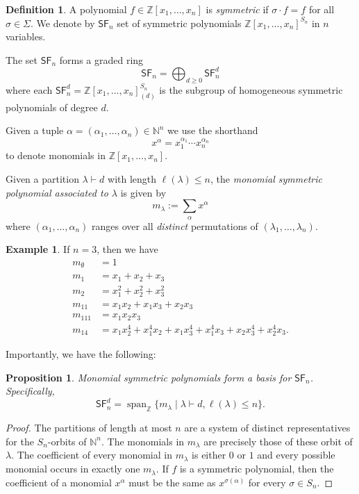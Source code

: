 \documentclass[12pt]{article}
\theoremstyle{plain}
\newtheorem{proposition}[theorem]{Proposition}
\theoremstyle{definition}
\newtheorem{definition}[theorem]{Definition}
\newtheorem{example}[theorem]{Example}
\theoremstyle{remark}
\numberwithin{equation}{section}
\begin{document}
\begin{definition}
A polynomial $f \in \mathbb{Z}[x_1,\ldots, x_n]$ is \emph{symmetric}
if $\sigma \cdot f = f$ for all $\sigma \in \Sigma$.
We denote by $\mathsf{SF}_n$ set of symmetric polynomials
$\mathbb{Z}[x_1,\ldots,x_n]^{S_n}$ in $n$ variables.
\end{definition}

The set $\mathsf{SF}_n$ forms a graded ring
\[
\mathsf{SF}_n = \bigoplus_{d \ge 0} \mathsf{SF}_n^d
\]
where each $\mathsf{SF}_n^d = \mathbb{Z}[x_1,\ldots,x_n]_{(d)}^{S_n}$
is the subgroup of homogeneous symmetric polynomials of degree $d$.

Given a tuple $\alpha = (\alpha_1,\ldots,\alpha_n) \in \mathbb{N}^n$
we use the shorthand
\[
x^\alpha = x_1^{\alpha_1} \cdots x_n^{\alpha_n}
\]
to denote monomials in $\mathbb{Z}[x_1,\ldots,x_n]$.

Given a partition $\lambda \vdash d$ with length $\ell(\lambda) \le n$,
the \emph{monomial symmetric polynomial associated to $\lambda$}
is given by
\[
m_\lambda := \sum_{\alpha} x^\alpha
\]
where $(\alpha_1,\ldots,\alpha_n)$ ranges over all
\emph{distinct} permutations of $(\lambda_1,\ldots,\lambda_n)$.

\begin{example}
If $n=3$, then we have
\begin{align*}
m_\emptyset &= 1\\
m_1 &= x_1 + x_2 + x_3\\
m_2 &= x_1^2 + x_2^2 + x_3^2\\
m_{11} &= x_1x_2 + x_1x_3 + x_2x_3\\
m_{111} &= x_1x_2x_3 \\
m_{14} &= x_1x_2^4 + x_1^4x_2 + x_1x_3^4 + x_1^4x_3 + x_2x_3^4 +
x_2^4x_3.
\end{align*}
\end{example}

Importantly, we have the following:

\begin{proposition}
Monomial symmetric polynomials form a basis for $\mathsf{SF}_n$.
Specifically,
\[
\mathsf{SF}_n^d = \operatorname{span}_{\mathbb{Z}}
\{ m_\lambda \mid \lambda \vdash d, \ell(\lambda) \le n \}.
\]
\end{proposition}

\begin{proof}
The partitions of length at most $n$ are a system of distinct
representatives for the $S_n$-orbits of $\mathbb{N}^n$.
The monomials in $m_\lambda$ are precisely those of these orbit of
$\lambda$.
The coefficient of every monomial
in $m_\lambda$ is either $0$ or $1$ and every possible monomial
occurs in exactly one $m_\lambda$.
If $f$ is a symmetric polynomial, then the coefficient
of a monomial $x^\alpha$ must be the same as $x^{\sigma(\alpha)}$
for every $\sigma \in S_n$.  
\end{proof}
\end{document}
